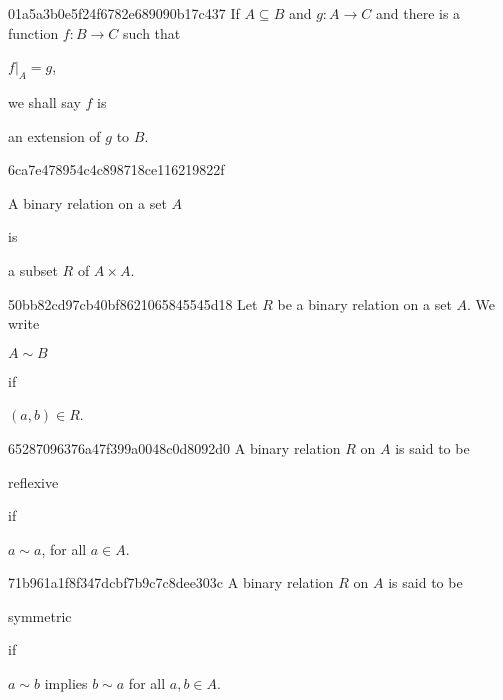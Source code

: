 \begin{note}{01a5a3b0e5f24f6782e689090b17c437}
    If \({ A \subseteq B }\) and \({ g : A \to C }\) and there is a function \({ f : B \to C }\) such that \begin{icloze}{2}\({ f|_{A} = g }\),\end{icloze} we shall say \({ f }\) is \begin{icloze}{1}an extension of \({ g }\) to \({ B }\).\end{icloze}
\end{note}

\begin{note}{6ca7e478954c4c898718ce116219822f}
    \begin{icloze}{2}A binary relation on a set \({ A }\)\end{icloze} is \begin{icloze}{1}a subset \({ R }\) of \({ A \times A }\).\end{icloze}
\end{note}

\begin{note}{50bb82cd97cb40bf8621065845545d18}
    Let \({ R }\) be a binary relation on a set \({ A }\).
    We write \begin{icloze}{2}\({ A \sim B }\)\end{icloze} if \begin{icloze}{1}\({ (a, b) \in R }\).\end{icloze}
\end{note}

\begin{note}{65287096376a47f399a0048c0d8092d0}
    A binary relation \({ R }\) on \({ A }\) is said to be \begin{icloze}{2}reflexive\end{icloze} if
    \begin{icloze}{1}
        \begin{center}
            \({ a \sim a }\), for all \({ a \in A }\).
        \end{center}
    \end{icloze}
\end{note}

\begin{note}{71b961a1f8f347dcbf7b9c7c8dee303c}
    A binary relation \({ R }\) on \({ A }\) is said to be \begin{icloze}{2}symmetric\end{icloze} if
    \begin{icloze}{1}
        \begin{center}
            \({ a \sim b }\) implies \({ b \sim a }\) for all \({ a, b \in A }\).
        \end{center}
    \end{icloze}
\end{note}

